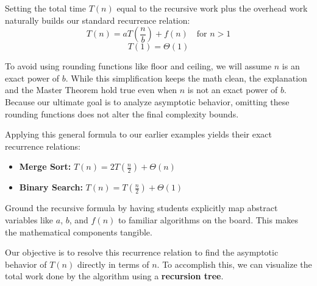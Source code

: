 Setting the total time $T(n)$ equal to the recursive work plus the overhead work naturally builds our standard recurrence relation:
\[ T(n) = aT\left(\frac{n}{b}\right) + f(n) \quad \text{for } n > 1 \]
\[ T(1) = \Theta(1) \]

 To avoid using rounding functions like floor and ceiling, we will assume $n$ is an exact power of $b$. While this simplification keeps the math clean, the explanation and the Master Theorem hold true even when $n$ is not an exact power of $b$. Because our ultimate goal is to analyze asymptotic behavior, omitting these rounding functions does not alter the final complexity bounds.

Applying this general formula to our earlier examples yields their exact recurrence relations:
\begin{itemize}
    \item \textbf{Merge Sort:} $T(n) = 2T\left(\frac{n}{2}\right) + \Theta(n)$
    \item \textbf{Binary Search:} $T(n) = T\left(\frac{n}{2}\right) + \Theta(1)$
\end{itemize}

\begin{educatortip}
Ground the recursive formula by having students explicitly map abstract variables like $a$, $b$, and $f(n)$ to familiar algorithms on the board. This makes the mathematical components tangible.
\end{educatortip}

Our objective is to resolve this recurrence relation to find the asymptotic behavior of $T(n)$ directly in terms of $n$. To accomplish this, we can visualize the total work done by the algorithm using a \textbf{recursion tree}.

